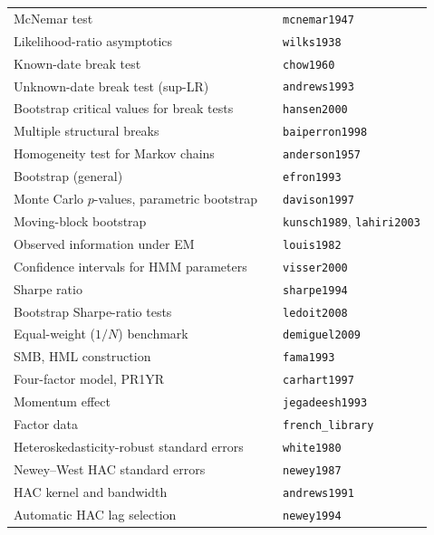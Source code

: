 \documentclass[11pt]{article}
\begin{document}
{\begin{longtable}{@{}p{6.3cm}p{5.2cm}p{3.6cm}@{}}
McNemar test & \citet{mcnemar1947} & \texttt{mcnemar1947} \\
Likelihood-ratio asymptotics & \citet{wilks1938} & \texttt{wilks1938} \\
Known-date break test & \citet{chow1960} & \texttt{chow1960} \\
Unknown-date break test (sup-LR) & \citet{andrews1993} & \texttt{andrews1993} \\
Bootstrap critical values for break tests & \citet{hansen2000} & \texttt{hansen2000} \\
Multiple structural breaks & \citet{baiperron1998} & \texttt{baiperron1998} \\
Homogeneity test for Markov chains & \citet{anderson1957} & \texttt{anderson1957} \\
Bootstrap (general) & \citet{efron1993} & \texttt{efron1993} \\
Monte Carlo $p$-values, parametric bootstrap & \citet{davison1997} & \texttt{davison1997} \\
Moving-block bootstrap & \citet{kunsch1989,lahiri2003} & \texttt{kunsch1989}, \texttt{lahiri2003} \\
Observed information under EM & \citet{louis1982} & \texttt{louis1982} \\
Confidence intervals for HMM parameters & \citet{visser2000} & \texttt{visser2000} \\
Sharpe ratio & \citet{sharpe1994} & \texttt{sharpe1994} \\
Bootstrap Sharpe-ratio tests & \citet{ledoit2008} & \texttt{ledoit2008} \\
Equal-weight ($1/N$) benchmark & \citet{demiguel2009} & \texttt{demiguel2009} \\
SMB, HML construction & \citet{fama1993} & \texttt{fama1993} \\
Four-factor model, PR1YR & \citet{carhart1997} & \texttt{carhart1997} \\
Momentum effect & \citet{jegadeesh1993} & \texttt{jegadeesh1993} \\
Factor data & \citet{french_library} & \texttt{french\_library} \\
Heteroskedasticity-robust standard errors & \citet{white1980} & \texttt{white1980} \\
Newey--West HAC standard errors & \citet{newey1987} & \texttt{newey1987} \\
HAC kernel and bandwidth & \citet{andrews1991} & \texttt{andrews1991} \\
Automatic HAC lag selection & \citet{newey1994} & \texttt{newey1994} \\

\end{longtable}}
\end{document}
